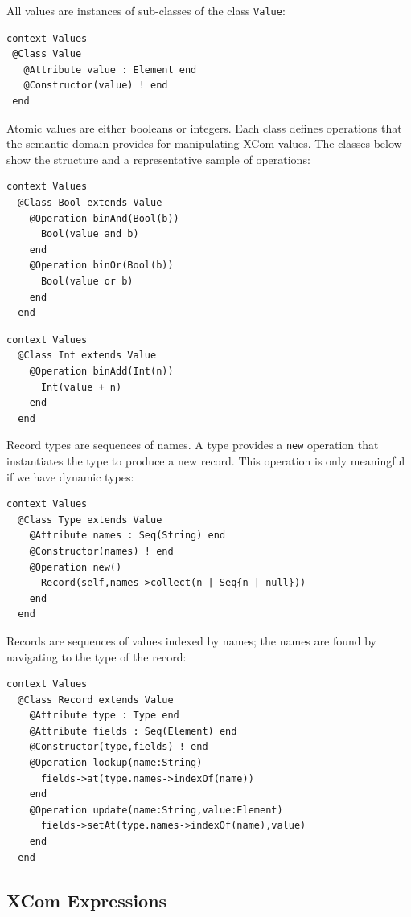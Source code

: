 \documentclass{article}
\begin{document}
All values are instances of sub-classes of the class {\tt Value}:
\begin{verbatim}
context Values
 @Class Value
   @Attribute value : Element end
   @Constructor(value) ! end
 end
\end{verbatim}
Atomic values are either booleans or integers. Each class defines operations
that the semantic domain provides for manipulating XCom values. The classes below show
the structure and a representative sample of operations:
\begin{verbatim}
context Values
  @Class Bool extends Value
    @Operation binAnd(Bool(b))
      Bool(value and b)
    end
    @Operation binOr(Bool(b))
      Bool(value or b)
    end
  end
\end{verbatim}

\begin{verbatim}
context Values
  @Class Int extends Value
    @Operation binAdd(Int(n))
      Int(value + n)
    end
  end
\end{verbatim}
Record types are sequences of names. A type provides a {\tt new} operation that instantiates the
type to produce a new record. This operation is only meaningful if we have dynamic types:
\begin{verbatim}
context Values
  @Class Type extends Value
    @Attribute names : Seq(String) end
    @Constructor(names) ! end
    @Operation new()
      Record(self,names->collect(n | Seq{n | null}))
    end
  end
\end{verbatim}
Records are sequences of values indexed by names; the names are found by navigating to the
type of the record:
\begin{verbatim}
context Values
  @Class Record extends Value
    @Attribute type : Type end
    @Attribute fields : Seq(Element) end
    @Constructor(type,fields) ! end
    @Operation lookup(name:String)
      fields->at(type.names->indexOf(name))
    end
    @Operation update(name:String,value:Element)
      fields->setAt(type.names->indexOf(name),value)
    end
  end
\end{verbatim}

\subsection{XCom Expressions}
\end{document}
